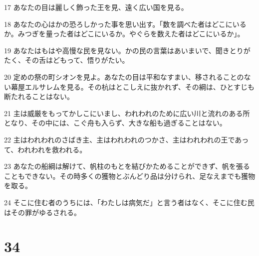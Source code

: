 \par 17 あなたの目は麗しく飾った王を見、遠く広い国を見る。
\par 18 あなたの心はかの恐ろしかった事を思い出す。「数を調べた者はどこにいるか。みつぎを量った者はどこにいるか。やぐらを数えた者はどこにいるか」。
\par 19 あなたはもはや高慢な民を見ない。かの民の言葉はあいまいで、聞きとりがたく、その舌はどもって、悟りがたい。
\par 20 定めの祭の町シオンを見よ。あなたの目は平和なすまい、移されることのない幕屋エルサレムを見る。その杭はとこしえに抜かれず、その綱は、ひとすじも断たれることはない。
\par 21 主は威厳をもってかしこにいまし、われわれのために広い川と流れのある所となり、その中には、こぐ舟も入らず、大きな船も過ぎることはない。
\par 22 主はわれわれのさばき主、主はわれわれのつかさ、主はわれわれの王であって、われわれを救われる。
\par 23 あなたの船綱は解けて、帆柱のもとを結びかためることができず、帆を張ることもできない。その時多くの獲物とぶんどり品は分けられ、足なえまでも獲物を取る。
\par 24 そこに住む者のうちには、「わたしは病気だ」と言う者はなく、そこに住む民はその罪がゆるされる。

\chapter{34}

